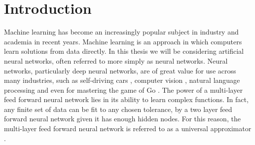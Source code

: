 \documentclass[letterpaper,12pt,titlepage,oneside,final]{book}
\begin{document}
	
	 
	
	\chapter{Introduction}
	
	Machine learning has become an increasingly popular subject in industry and academia in recent years. Machine learning is an approach in which computers learn solutions from data directly. In this thesis we will be considering artificial neural networks, often referred to more simply as neural networks. Neural networks, particularly deep neural networks, are of great value for use across many industries, such as self-driving cars \cite{bojarski2016end}, computer vision \cite{krizhevsky2012imagenet}, natural language processing \cite{ma2002natural} and even for mastering the game of Go \cite{silver2016mastering}. The power of a multi-layer feed forward neural network lies in its ability to learn complex functions. In fact, any finite set of data can be fit to any chosen tolerance, by a two layer feed forward neural network given it has enough hidden nodes. For this reason, the multi-layer feed forward neural network is referred to as a universal approximator \cite{hornik1989multilayer}. 
	
\end{document}
